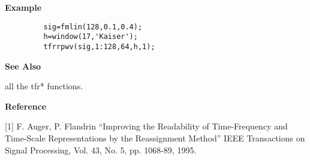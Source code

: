 
{\bf \large {}\selectfont Example}
\begin{verbatim}
         sig=fmlin(128,0.1,0.4); 
         h=window(17,'Kaiser'); 
         tfrrpwv(sig,1:128,64,h,1);
\end{verbatim}
\vspace*{.35cm}

{\bf \large {}\selectfont See Also}\\
\hspace*{1.5cm}
\begin{minipage}[t]{13.5cm}
all the {\ty tfr*} functions.
\end{minipage}
\vspace*{.35cm}
{\bf \large {}\selectfont Reference}\\
\hspace*{1.5cm}
\begin{minipage}[t]{13.5cm}
[1] F. Auger, P. Flandrin ``Improving the Readability of Time-Frequency and
Time-Scale Representations by the Reassignment Method'' IEEE Transactions
on Signal Processing, Vol. 43, No. 5, pp. 1068-89, 1995.
\end{minipage}

